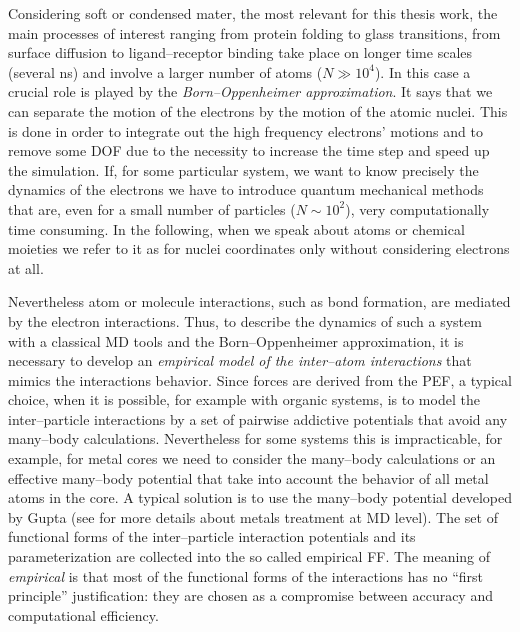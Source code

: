 Considering soft or condensed mater, the most relevant for this thesis work, the main processes of interest 
ranging from protein folding to glass transitions, from surface diffusion to ligand--receptor binding take place 
on longer time scales (several ns) and involve a larger number of atoms ($N \gg 10^4$). In this case a crucial 
role is played by the \textit{Born--Oppenheimer approximation}. It says that we can separate the motion of the 
electrons by the motion of the atomic nuclei. This is done in order to integrate out the high frequency 
electrons' motions and to remove some \ac{DOF} due to the necessity to increase the time step and speed up the 
simulation. If, for some particular system, we want to know precisely the dynamics of the electrons we have to 
introduce quantum mechanical methods that are, even for a small number of particles ($N\sim 10^2$), very 
computationally time consuming. In the following, when we speak about atoms or chemical moieties we refer to it 
as for nuclei coordinates only without considering electrons at all.

Nevertheless atom or molecule interactions, such as bond formation, are mediated by the electron interactions. 
Thus, to describe the dynamics of such a system with a classical \ac{MD} tools and the Born--Oppenheimer 
approximation, it is necessary to develop an \textit{empirical model of the inter--atom interactions} that mimics 
the interactions behavior. Since forces are derived from the \ac{PEF}, a typical choice, when it is possible, for 
example with organic systems, is to model the inter--particle interactions by a set of pairwise addictive 
potentials that avoid any many--body calculations. Nevertheless for some systems this is impracticable, for 
example, for metal cores we need to consider the many--body calculations or an effective many--body potential 
that take into account the behavior of all metal atoms in the core. A typical solution is to use the many--body 
potential developed by Gupta (see \cite{Leach} for more details about metals treatment at \ac{MD} level). The set 
of functional forms of the inter--particle interaction potentials and its parameterization are collected into the 
so called empirical \acf{FF}. The meaning of \textit{empirical} is that most of the functional forms of the 
interactions has no ``first principle'' justification: they are chosen as a compromise between accuracy and 
computational efficiency. 

